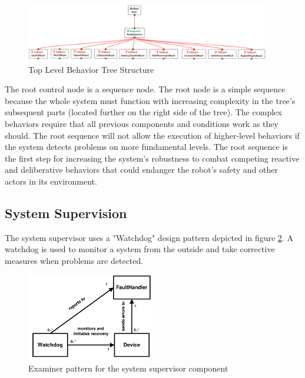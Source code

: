 \begin{figure}[ht]
	\centering
	\includegraphics[width=0.95\textwidth]{images/simplified_bt_inverted.png}
	\caption{Top Level Behavior Tree Structure}
	\label{fig:top_level_bt}
\end{figure}

The root control node is a sequence node. The root node is a simple sequence because the whole system must function with increasing complexity in the tree's subsequent parts (located further on the right side of the tree). The complex behaviors require that all previous components and conditions work as they should. The root sequence will not allow the execution of higher-level behaviors if the system detects problems on more fundamental levels. The root sequence is the first step for increasing the system's robustness to combat competing reactive and deliberative behaviors that could endanger the robot's safety and other actors in its environment. 

\subsection{System Supervision}
\label{subsec:BT System Supervision}

The system supervisor uses a "Watchdog" design pattern depicted in figure \ref{fig:watchdog_pattern}. A watchdog is used to monitor a system from the outside and take corrective measures when problems are detected. 

\begin{figure}[ht]
	\centering
	\includegraphics[width=0.5\textwidth]{images/watchdog_pattern.png}
	\caption{Examiner pattern for the system supervisor component \cite{konrad2003defining}}
	\label{fig:watchdog_pattern}
\end{figure}

